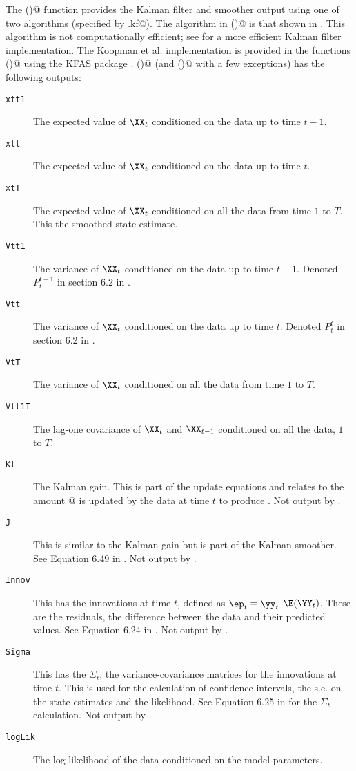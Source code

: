 The \verb@MARSSkf()@ function provides the Kalman filter and smoother output using one of two algorithms (specified by \verb@fun.kf@).  The algorithm in 
\verb@MARSSkfss()@ is that shown in \citet{ShumwayStoffer2006}.  This algorithm is not computationally efficient; see \citet[sec. 4.3]{Koopmanetal1998} for a more efficient Kalman filter implementation. The Koopman et al. implementation is provided in the functions \verb@MARSSkfas()@ using the KFAS \R package \citep{Helske2017}.  \verb@MARSSkfss()@ (and \verb@MARSSkfas()@ with a few exceptions) has the following outputs:
\begin{description}
\item[\texttt{xtt1 }] The expected value of $\XX_t$ conditioned on the data up to time $t-1$.
\item[\texttt{xtt  }] The expected value of $\XX_t$ conditioned on the data up to time $t$.
\item[\texttt{xtT  }] The expected value of $\XX_t$ conditioned on all the data from time $1$ to $T$.  This the smoothed state estimate.
\item[\texttt{Vtt1 }] The variance of $\XX_t$ conditioned on the data up to time $t-1$.  Denoted $P_t^{t-1}$ in section 6.2 in \citet{ShumwayStoffer2006}.
\item[\texttt{Vtt  }] The variance of $\XX_t$ conditioned on the data up to time $t$. Denoted $P_t^t$ in section 6.2 in \citet{ShumwayStoffer2006}.
\item[\texttt{VtT  }] The variance of $\XX_t$ conditioned on all the data from time $1$ to $T$.
\item[\texttt{Vtt1T}] The lag-one covariance of $\XX_t$ and $\XX_{t-1}$ conditioned on all the data, $1$ to $T$.
\item[\texttt{Kt   }] The Kalman gain.  This is part of the update equations and relates to the amount @ is updated by the data at time $t$ to produce \verb@xtt@.    Not  output by \verb@MARSSkfas@.
\item[\texttt{J    }] This is similar to the Kalman gain but is part of the Kalman smoother.  See Equation 6.49 in \citet{ShumwayStoffer2006}.     Not  output by \verb@MARSSkfas@.
\item[\texttt{Innov}] This has the innovations at time $t$, defined as $\ep_t \equiv \yy_t$-$\E(\YY_t)$.  These are the residuals, the difference between the data and their predicted values.  See Equation 6.24 in \citet{ShumwayStoffer2006}. Not  output by \verb@MARSSkfas@.
\item[\texttt{Sigma}] This has the $\Sigma_t$, the variance-covariance matrices for the innovations at time $t$.  This is used for the calculation of confidence intervals, the s.e. on the state estimates and the likelihood.  See Equation 6.25 in \citet{ShumwayStoffer2006} for the $\Sigma_t$ calculation.  Not  output by \verb@MARSSkfas@.
\item[\texttt{logLik}] The log-likelihood of the data conditioned on the model parameters.  
\end{description}


